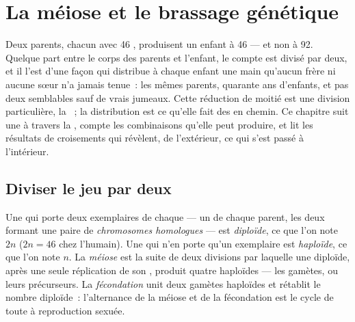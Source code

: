 \chapter{La méiose et le brassage génétique}\label{ch:g12:meiosis-genetic-shuffling}

Deux parents, chacun avec 46 , produisent un enfant à 46 ---
et non à 92. Quelque part entre le corps des parents et l'enfant, le
compte est divisé par deux, et il l'est d'une façon qui distribue à
chaque enfant une main qu'aucun frère ni aucune sœur n'a jamais tenue~:
les mêmes parents, quarante ans d'enfants, et pas deux semblables sauf
de vrais jumeaux. Cette réduction de moitié est une division
particulière, la ~; la distribution est ce qu'elle fait des
 en chemin. Ce chapitre suit une  à travers la
, compte les combinaisons qu'elle peut produire, et lit les
résultats de croisements qui révèlent, de l'extérieur, ce qui s'est
passé à l'intérieur.

\section{Diviser le jeu par deux}

\begin{definition}\label{def:g12:meiosis-genetic-shuffling:meiosis}
Une  qui porte deux exemplaires de chaque  --- un de
chaque parent, les deux formant une paire de
\emph{chromosomes homologues} --- est
\emph{diploïde}, ce que l'on note $2n$ ($2n = 46$ chez
l'humain). Une  qui n'en porte qu'un exemplaire est
\emph{haploïde}, ce que l'on note $n$. La
\emph{méiose} est la suite de deux divisions par laquelle
une  diploïde, après une seule réplication de son , produit
quatre  haploïdes --- les gamètes, ou leurs précurseurs. La
\emph{fécondation} unit deux gamètes haploïdes et rétablit le nombre
diploïde~: l'alternance de la méiose et de la fécondation est le cycle
de toute  à reproduction sexuée.
\end{definition}

